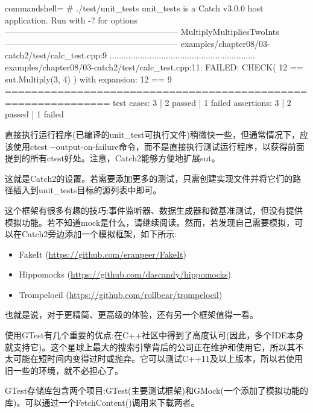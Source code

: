 \begin{tcblisting}{commandshell={}}
# ./test/unit_tests
unit_tests is a Catch v3.0.0 host application.
Run with -? for options
--------------------------------------------------------------
MultiplyMultipliesTwoInts
--------------------------------------------------------------
examples/chapter08/03-catch2/test/calc_test.cpp:9
..............................................................
examples/chapter08/03-catch2/test/calc_test.cpp:11: FAILED:
  CHECK( 12 == sut.Multiply(3, 4) )
with expansion:
  12 == 9
==============================================================
test cases: 3 | 2 passed | 1 failed
assertions: 3 | 2 passed | 1 failed
\end{tcblisting}

直接执行运行程序(已编译的unit\_test可执行文件)稍微快一些，但通常情况下，应该使用ctest -{}-output-on-failure命令，而不是直接执行测试运行程序，以获得前面提到的所有ctest好处。注意，Catch2能够方便地扩展sut。

这就是Catch2的设置。若需要添加更多的测试，只需创建实现文件并将它们的路径插入到unit\_tests目标的源列表中即可。

这个框架有很多有趣的技巧:事件监听器、数据生成器和微基准测试，但没有提供模拟功能。若不知道mock是什么，请继续阅读。然而，若发现自己需要模拟，可以在Catch2旁边添加一个模拟框架，如下所示:

\begin{itemize}
\item 
FakeIt (\url{https://github.com/eranpeer/FakeIt})

\item 
Hippomocks (\url{https://github.com/dascandy/hippomocks})

\item 
Trompeloeil (\url{https://github.com/rollbear/trompeloeil})
\end{itemize}

也就是说，对于更精简、更高级的体验，还有另一个框架值得一看。


使用GTest有几个重要的优点:在C++社区中得到了高度认可(因此，多个IDE本身就支持它)。这个星球上最大的搜索引擎背后的公司正在维护和使用它，所以其不太可能在短时间内变得过时或抛弃。它可以测试C++11及以上版本，所以若使用旧一些的环境，就不必担心了。

GTest存储库包含两个项目:GTest(主要测试框架)和GMock(一个添加了模拟功能的库)。可以通过一个FetchContent()调用来下载两者。

